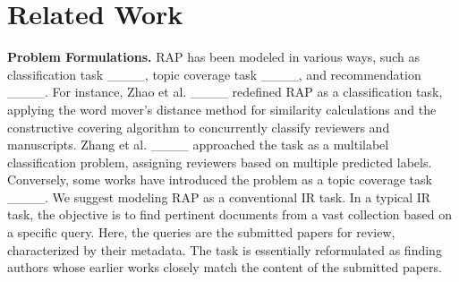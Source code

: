 \section{Related Work}

\textbf{Problem Formulations.}
RAP has been modeled in various ways, such as classification task ____, topic coverage task ____, and recommendation ____. For instance, Zhao et al. ____ redefined RAP as a classification task, applying the word mover’s distance method for similarity calculations and the constructive covering algorithm to concurrently classify reviewers and manuscripts. Zhang et al. ____ approached the task as a multilabel classification problem, assigning reviewers based on multiple predicted labels. Conversely, some works have introduced the problem as a topic coverage task ____.
We suggest modeling RAP as a conventional IR task. In a typical IR task, the objective is to find pertinent documents from a vast collection based on a specific query. Here, the queries are the submitted papers for review, characterized by their metadata. %
The task is essentially reformulated as finding authors whose earlier works closely match the content of the submitted papers.

